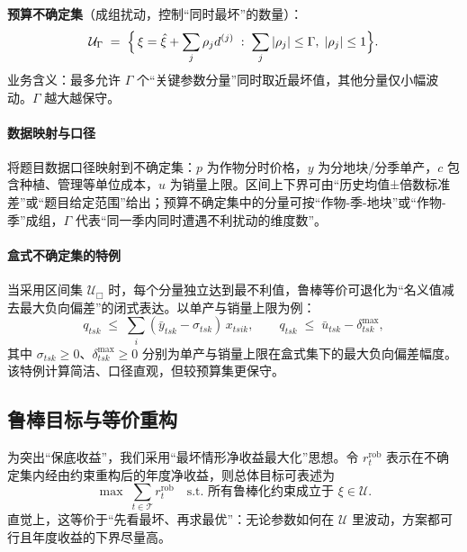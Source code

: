 \textbf{预算不确定集}（成组扰动，控制“同时最坏”的数量）：
\begin{equation}
  \mathcal{U}_{\Gamma} \;=\; \Bigl\{\, \xi=\hat{\xi}+\sum_{j} \rho_j d^{(j)} \;:\; \sum_j |\rho_j| \le \Gamma,\; |\rho_j| \le 1 \Bigr\}. \label{set:model2-ubudget}
\end{equation}
业务含义：最多允许 $\Gamma$ 个“关键参数分量”同时取近最坏值，其他分量仅小幅波动。$\Gamma$ 越大越保守。

\paragraph{数据映射与口径}
将题目数据口径映射到不确定集：$p$ 为作物分时价格，$y$ 为分地块/分季单产，$c$ 包含种植、管理等单位成本，$u$ 为销量上限。区间上下界可由“历史均值±倍数标准差”或“题目给定范围”给出；预算不确定集中的分量可按“作物-季-地块”或“作物-季”成组，$\Gamma$ 代表“同一季内同时遭遇不利扰动的维度数”。

\paragraph{盒式不确定集的特例}
当采用区间集 $\mathcal{U}_{\Box}$ 时，每个分量独立达到最不利值，鲁棒等价可退化为“名义值减去最大负向偏差”的闭式表达。以单产与销量上限为例：
\begin{equation}
  q_{tsk} \;\le\; \sum_i (\bar y_{tsk}-\sigma_{tsk})\,x_{tsik},\qquad
  q_{tsk} \;\le\; \bar u_{tsk} - \delta^{\max}_{tsk},\label{cons:model2-rc-yield-box}
\end{equation}
其中 $\sigma_{tsk}\ge0$、$\delta^{\max}_{tsk}\ge0$ 分别为单产与销量上限在盒式集下的最大负向偏差幅度。该特例计算简洁、口径直观，但较预算集更保守。

\subsection{鲁棒目标与等价重构}
为突出“保底收益”，我们采用“最坏情形净收益最大化”思想。令 $r_t^{\mathrm{rob}}$ 表示在不确定集内经由约束重构后的年度净收益，则总体目标可表述为
\begin{equation}
  \max \;\sum_{t \in \mathcal{T}} r_t^{\mathrm{rob}} \quad \text{s.t. 所有鲁棒化约束成立于 } \xi \in \mathcal{U}. \label{obj:model2-robust}
\end{equation}
直觉上，这等价于“先看最坏、再求最优”：无论参数如何在 $\mathcal{U}$ 里波动，方案都可行且年度收益的下界尽量高。

